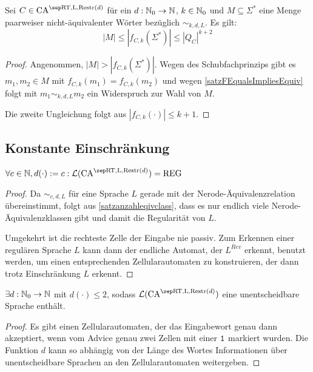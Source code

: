 \begin{corollary}
    \label{satzanzahleqivclass}
    Sei $C \in \CAM{\CART, \CALeft, \CARestr(d)}$ für ein $d: \mathbb{N}_0 \to \mathbb{N}$, $k \in \mathbb{N}_0$ und
    $M \subseteq \Sigma^*$ eine Menge paarweiser nicht-äquivalenter Wörter bezüglich $\sim_{k,d,L}$. Es gilt:
    \[
        |M| \leq |f_{C, k}(\Sigma^*)| \leq |Q_C|^{k + 2}
    \]
\end{corollary}
\begin{proof}
    Angenommen, $|M| > |f_{C, k}(\Sigma^*)|$. Wegen des Schubfachprinzips gibt es $m_1, m_2 \in M$ mit $f_{C,k}(m_1) = f_{C,k}(m_2)$ und wegen \cref{satzFEqualsImpliesEquiv} folgt mit $m_1 \sim_{k,d,L} m_2$ ein Widerspruch zur Wahl von $M$.
    
    Die zweite Ungleichung folgt aus $|f_{C,k}(\cdot)| \leq k + 1$.
\end{proof}

\subsection{Konstante Einschränkung}

\begin{satz}
    $\forall c \in \N, d(\cdot) := c: \CAL{\CART, \CALeft, \CARestr(d)} = \textrm{REG}$
\end{satz}
\begin{proof}
    Da $\sim_{c,d,L}$ für eine Sprache $L$ gerade mit der Nerode-Äquivalenzrelation übereinstimmt,
    folgt aus \cref{satzanzahleqivclass}, dass es nur endlich viele Nerode-Äquivalenzklassen gibt und damit die Regularität von $L$.
    
    Umgekehrt ist die rechteste Zelle der Eingabe nie passiv.
    Zum Erkennen einer regulären Sprache $L$ kann dann der endliche Automat, der $L^{Rev}$ erkennt, benutzt werden,
    um einen entsprechenden Zellularautomaten zu konstruieren, der dann trotz Einschränkung $L$ erkennt.
\end{proof}

\begin{satz}
    \label{einschraenkungUnentscheidbar}
    $\exists d: \mathbb{N}_0 \to \mathbb{N}$ mit $d(\cdot) \leq 2$, sodass $\CAL{\CART, \CALeft, \CARestr(d)}$ eine unentscheidbare Sprache enthält.
\end{satz}
\begin{proof}
    Es gibt einen Zellularautomaten, der das Eingabewort genau dann akzeptiert, wenn vom Advice genau zwei Zellen mit einer $\texttt{1}$ markiert wurden.
    Die Funktion $d$ kann so abhängig von der Länge des Wortes Informationen über unentscheidbare Sprachen an den Zellularautomaten weitergeben.
\end{proof}

